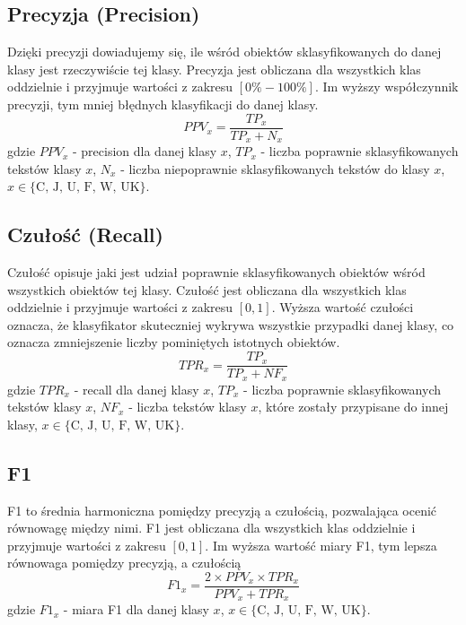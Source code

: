 \documentclass{article}
\begin{document}
\subsection{Precyzja (Precision)}
Dzięki precyzji dowiadujemy się, ile wśród obiektów sklasyfikowanych do danej klasy jest rzeczywiście tej klasy. Precyzja jest obliczana dla wszystkich klas oddzielnie i przyjmuje wartości z zakresu \([0\% -100\%]\). Im wyższy współczynnik precyzji, tym mniej błędnych klasyfikacji do danej klasy.
\begin{equation}
    PPV_x = \frac {TP_x}{TP_x + N_x}
\end{equation}
gdzie \(PPV_x\) - precision dla danej klasy \(x\), \(TP_x\) - liczba poprawnie sklasyfikowanych tekstów klasy \(x\), \(N_x\) - liczba niepoprawnie sklasyfikowanych  tekstów do klasy \(x\), \(x \in \{ \text{C, J, U, F, W, UK} \}\).
\subsection{Czułość (Recall)}
Czułość opisuje jaki jest udział poprawnie sklasyfikowanych obiektów wśród wszystkich obiektów tej klasy. Czułość jest obliczana dla wszystkich klas oddzielnie i przyjmuje wartości z zakresu \([0, 1]\). Wyższa wartość czułości oznacza, że klasyfikator skuteczniej wykrywa wszystkie przypadki danej klasy, co oznacza zmniejszenie liczby pominiętych istotnych obiektów.
\begin{equation}
    TPR_x = \frac {TP_x}{TP_x + NF_x}
\end{equation}
gdzie \(TPR_x\) - recall dla danej klasy \(x\), \(TP_x\) - liczba poprawnie sklasyfikowanych tekstów klasy \(x\), \(NF_x\) - liczba tekstów klasy \(x\), które zostały przypisane do innej klasy, \(x \in \{ \text{C, J, U, F, W, UK} \}\). 
\subsection{F1}
F1 to średnia harmoniczna pomiędzy precyzją a czułością, pozwalająca ocenić równowagę między nimi.  F1 jest obliczana dla wszystkich klas oddzielnie i przyjmuje wartości z zakresu \([0, 1]\). Im wyższa wartość miary F1, tym lepsza równowaga pomiędzy precyzją, a czułością
\begin{equation}
    F1_x = \frac{2 \times PPV_x \times TPR_x}{PPV_x + TPR_x}
\end{equation}
gdzie \(F1_x\) - miara F1 dla danej klasy \(x\), \(x \in \{ \text{C, J, U, F, W, UK} \}\). 
\end{document}
